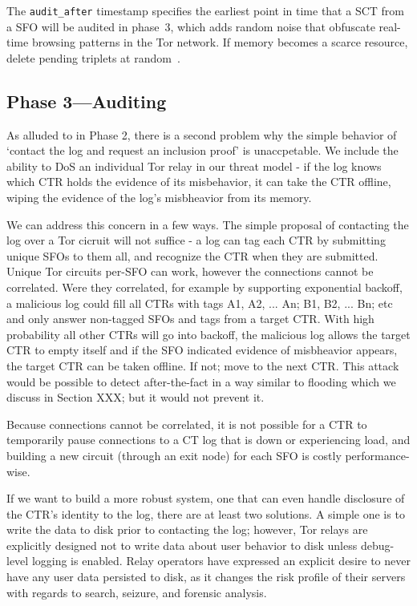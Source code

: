 The \texttt{audit\_after} timestamp specifies the earliest point in time that a SCT
from a SFO will be audited in phase~3, which adds random noise that obfuscate
real-time browsing patterns in the Tor network.  If memory becomes a scarce
resource, delete pending triplets at random~\cite{nordberg}.



\subsection{Phase 3---Auditing} \label{sec:base:phase3}

As alluded to in Phase 2, there is a second problem why the simple behavior of
`contact the log and request an inclusion proof' is unaccpetable. We include
the ability to DoS an individual Tor relay in our threat model - if the log
knows which CTR holds the evidence of its misbehavior, it can take the CTR
offline, wiping the evidence of the log's misbheavior from its memory. 

We can address this concern in a few ways. The simple proposal of contacting
the log over a Tor cicruit will not suffice - a log can tag each CTR by
submitting unique SFOs to them all, and recognize the CTR when they are
submitted. Unique Tor circuits per-SFO can work, however the connections
cannot be correlated. Were they correlated, for example by supporting
exponential backoff, a malicious log could fill all CTRs with tags A1, A2, ... An;
B1, B2, ... Bn; etc and only answer non-tagged SFOs and tags from a target
CTR. With high probability all other CTRs will go into backoff, the malicious log
allows the target CTR to empty itself and if the SFO indicated evidence of
misbheavior appears, the target CTR can be taken offline. If not; move to the
next CTR. This attack would be possible to detect after-the-fact in a way similar to
flooding which we discuss in Section XXX; but it would not prevent it.

Because connections cannot be correlated, it is not possible for a CTR to
temporarily pause connections to a CT log that is down or experiencing load, and
building a new circuit (through an exit node) for each SFO is costly
performance-wise.

If we want to build a more robust system, one that can even handle disclosure of
the CTR's identity to the log, there are at least two solutions. A simple one
is to write the data to disk prior to contacting the log; however, Tor relays
are explicitly designed not to write data about user behavior to disk unless
debug-level logging is enabled. Relay operators have expressed an explicit desire
to never have any user data persisted to disk, as it changes the risk profile of
their servers with regards to search, seizure, and forensic analysis.

